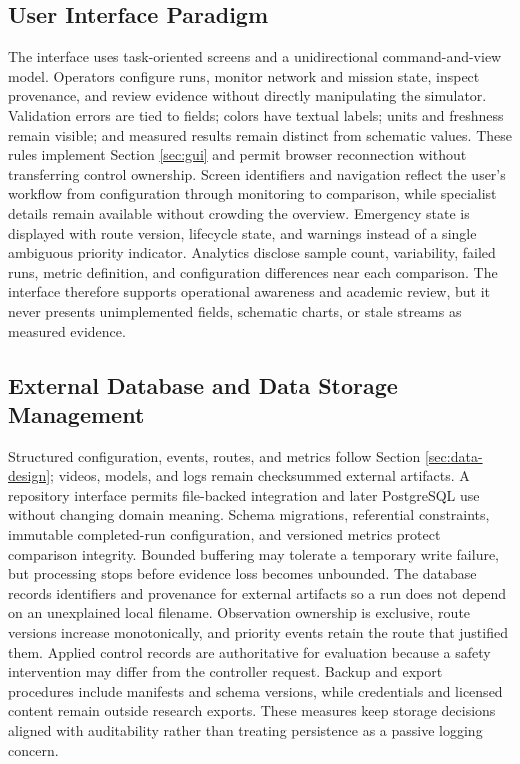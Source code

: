 \subsection{User Interface Paradigm}

The interface uses task-oriented screens and a unidirectional command-and-view model. Operators configure runs, monitor network and mission state, inspect provenance, and review evidence without directly manipulating the simulator. Validation errors are tied to fields; colors have textual labels; units and freshness remain visible; and measured results remain distinct from schematic values. These rules implement Section \ref{sec:gui} and permit browser reconnection without transferring control ownership. Screen identifiers and navigation reflect the user's workflow from configuration through monitoring to comparison, while specialist details remain available without crowding the overview. Emergency state is displayed with route version, lifecycle state, and warnings instead of a single ambiguous priority indicator. Analytics disclose sample count, variability, failed runs, metric definition, and configuration differences near each comparison. The interface therefore supports operational awareness and academic review, but it never presents unimplemented fields, schematic charts, or stale streams as measured evidence.

\subsection{External Database and Data Storage Management}

Structured configuration, events, routes, and metrics follow Section \ref{sec:data-design}; videos, models, and logs remain checksummed external artifacts. A repository interface permits file-backed integration and later PostgreSQL use without changing domain meaning. Schema migrations, referential constraints, immutable completed-run configuration, and versioned metrics protect comparison integrity. Bounded buffering may tolerate a temporary write failure, but processing stops before evidence loss becomes unbounded. The database records identifiers and provenance for external artifacts so a run does not depend on an unexplained local filename. Observation ownership is exclusive, route versions increase monotonically, and priority events retain the route that justified them. Applied control records are authoritative for evaluation because a safety intervention may differ from the controller request. Backup and export procedures include manifests and schema versions, while credentials and licensed content remain outside research exports. These measures keep storage decisions aligned with auditability rather than treating persistence as a passive logging concern.

